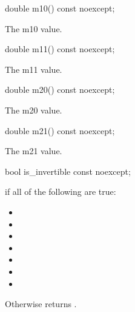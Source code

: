 \begin{itemdecl}
	double m10() const noexcept;
\end{itemdecl}
\begin{itemdescr}
	\pnum
	\returns
	The m10 value.
\end{itemdescr}

\begin{itemdecl}
	double m11() const noexcept;
\end{itemdecl}
\begin{itemdescr}
	\pnum
	\returns
	The m11 value.
\end{itemdescr}

\begin{itemdecl}
	double m20() const noexcept;
\end{itemdecl}
\begin{itemdescr}
	\pnum
	\returns
	The m20 value.
\end{itemdescr}

\begin{itemdecl}
	double m21() const noexcept;
\end{itemdecl}
\begin{itemdescr}
	\pnum
	\returns
	The m21 value.
\end{itemdescr}

\begin{itemdecl}
bool is_invertible const noexcept;
\end{itemdecl}
\begin{itemdescr}
\pnum
\returns
{} if all of the following are true:
\begin{itemize}
	\item {}
	\item {}
	\item {}
	\item {}
	\item {}
	\item {}
	\item {}
\end{itemize}

\pnum
Otherwise returns .
\end{itemdescr}


